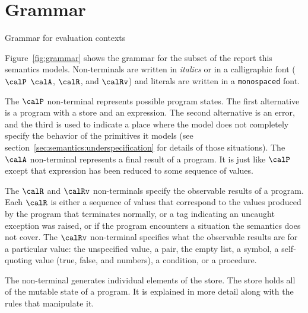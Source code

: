 \section{Grammar}\label{sec:semantics:grammar}

\beginfig
\subfigureadjust{}

\caption{Grammar for evaluation contexts}\label{fig:ec-grammar}
\endfig
\subfigurestop{}

Figure~\ref{fig:grammar} shows the grammar for the subset of the
report this semantics models. Non-terminals are written in
\textit{italics} or in a calligraphic font ($\calP$
$\calA$, $\calR$, and $\calRv$) and literals are 
written in a \texttt{monospaced} font.

The $\calP$ non-terminal represents possible program states. The
first alternative is a program with a store and an expression. The second alternative is an error, and the third is
used to indicate a place where the model does not completely specify
the behavior of the primitives it models (see section~\ref{sec:semantics:underspecification} for details of those situations). 
The $\calA$ non-terminal
represents a final result of a program. It is just like $\calP$
except that expression has been reduced to some sequence of values.

The $\calR$ and $\calRv$ non-terminals specify the observable results of a program. Each $\calR$ is either a sequence of values that correspond to the values produced by the program that terminates normally, or a tag indicating an uncaught exception was raised, or  if the program encounters a situation the semantics does not cover. The $\calRv$ non-terminal specifies what the observable results are for a particular value: the unspecified value, a pair, the empty list, a symbol, a self-quoting value (true, false, and numbers), a condition, or a procedure.

The  non-terminal generates individual elements of the
store. The store holds all of the mutable state of a program. It is
explained in more detail along with the rules that manipulate it.

